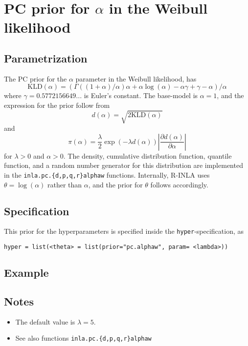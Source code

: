 \documentclass[a4paper,11pt]{article}
\begin{document}
\section*{PC prior for $\alpha$ in the Weibull likelihood}

\subsection*{Parametrization}
The PC prior for the $\alpha$ parameter in the Weibull likelihood, has
\begin{displaymath}
    \text{KLD}(\alpha) = (\Gamma((1 + \alpha)/\alpha)\alpha + \alpha
    \log(\alpha) -
    \alpha\gamma + \gamma - \alpha)/\alpha
\end{displaymath}
where $\gamma = 0.5772156649...$ is Euler's constant. The base-model is
$\alpha=1$, and the expression for the prior follow from
\begin{displaymath}
    d(\alpha) = \sqrt{2\text{KLD}(\alpha)}
\end{displaymath}
and
\begin{displaymath}
    \pi(\alpha) = \frac{\lambda}{2} \exp(-\lambda d(\alpha)) \left|\frac{\partial
    d(\alpha)}{\partial\alpha}\right|
\end{displaymath}
for $\lambda>0$ and $\alpha{} > 0$. The density, cumulative
distribution function, quantile function, and a random number
generator for this distribution are implemented in the
\texttt{inla.pc.\{d,p,q,r\}alphaw} functions. Internally, R-INLA uses
$\theta = \log(\alpha)$ rather than $\alpha$, and the prior for
$\theta$ follows accordingly.

\subsection*{Specification}
This prior for the hyperparameters is specified inside the
\texttt{hyper}-specification, as
\begin{center}
    \texttt{hyper = list(<theta> =
        list(prior="pc.alphaw", param= <lambda>))}
\end{center}

\subsection*{Example}

\subsection*{Notes}

\begin{itemize}
\item The default value is $\lambda = 5$.
\item See also functions \texttt{inla.pc.\{d,p,q,r\}alphaw}
\end{itemize}
\end{document}
